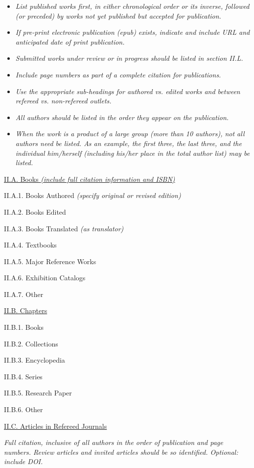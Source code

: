 \documentclass[11pt,letterpaper]{article}
\begin{document}
\begin{itemize}\itemsep0em
\item \textit{List published works first, in either chronological order or its inverse, followed (or preceded) by works not yet published but accepted for publication.}
\item \textit{If pre-print electronic publication (epub) exists, indicate and include URL and anticipated date of print publication.}
\item \textit{Submitted works under review or in progress should be listed in section II.L.}
\item \textit{Include page numbers as part of a complete citation for publications.}
\item \textit{Use the appropriate sub-headings for authored vs. edited works and between refereed vs. non-refereed outlets.}
\item \textit{All authors should be listed in the order they appear on the publication.}
\item \textit{When the work is a product of a large group (more than 10 authors), not all authors need be listed.  As an example, the first three, the last three, and the individual him/herself (including his/her place in the total author list) may be listed.}
\end{itemize}

\noindent\underline{II.A. Books \textit{(include full citation information and ISBN)}}

II.A.1. Books Authored \textit{(specify original or revised edition)}

II.A.2. Books Edited

II.A.3. Books Translated \textit{(as translator)}

II.A.4. Textbooks

II.A.5. Major Reference Works

II.A.6. Exhibition Catalogs

II.A.7. Other


\underline{II.B. Chapters}

II.B.1. Books

II.B.2. Collections

II.B.3. Encyclopedia

II.B.4. Series

II.B.5. Research Paper

II.B.6. Other


\underline{II.C. Articles in Refereed Journals}

\textit{Full citation, inclusive of all authors in the order of publication and page numbers. Review articles and invited articles should be so identified. Optional: include DOI.}
\end{document}

